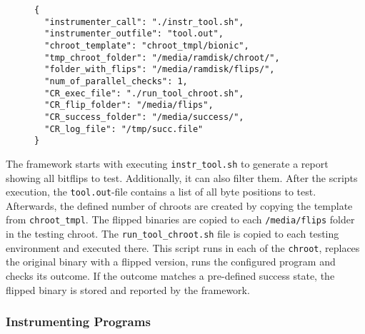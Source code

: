 \begin{figure}
\begin{minipage}{\linewidth}
\begin{lstlisting}[style=nasm,
                   caption={JSON style config file for the framework, showing
all parameters used to tweak each part of the framework. Entries
starting with \texttt{CR\_} are used inside the testing \texttt{chroot}.},
                   label={lst:expconfig}]
{
  "instrumenter_call": "./instr_tool.sh",
  "instrumenter_outfile": "tool.out",
  "chroot_template": "chroot_tmpl/bionic",
  "tmp_chroot_folder": "/media/ramdisk/chroot/",
  "folder_with_flips": "/media/ramdisk/flips/",
  "num_of_parallel_checks": 1,
  "CR_exec_file": "./run_tool_chroot.sh",
  "CR_flip_folder": "/media/flips",
  "CR_success_folder": "/media/success/",
  "CR_log_file": "/tmp/succ.file"
}
\end{lstlisting}
\end{minipage}
\end{figure}

The framework starts with executing \texttt{instr\_tool.sh} to generate a report
showing all bitflips to test. Additionally, it can also filter them. After the
script\textquotesingle s execution, the \texttt{tool.out}-file contains a list
of all byte positions to test. Afterwards, the defined number of chroots are
created by copying the template from \texttt{chroot\_tmpl}. The flipped
binaries are copied to each \texttt{/media/flips} folder in the testing chroot.
The \texttt{run\_tool\_chroot.sh} file is copied to each testing environment
and executed there. This script runs in each of the \texttt{chroot}, replaces
the original binary with a flipped version, runs the configured program and
checks it\textquotesingle s outcome. If the outcome matches a pre-defined
success state, the flipped binary is stored and reported by the framework.

\subsubsection{Instrumenting Programs}


